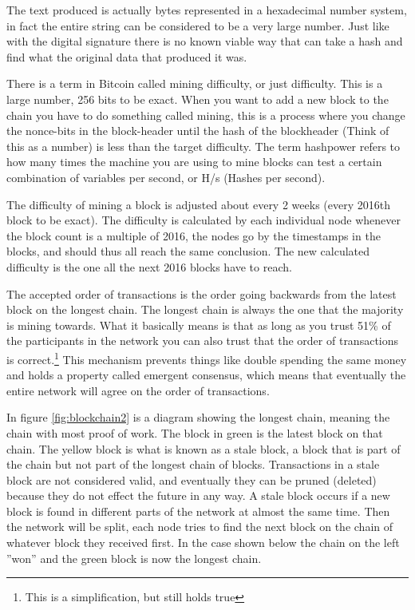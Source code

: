 The text produced is actually bytes represented in a hexadecimal number system,
in fact the entire string can be considered to be a very large number. Just like
with the digital signature there is no known viable way that can take a hash and
find what the original data that produced it was.

There is a term in Bitcoin called mining difficulty, or just difficulty. This
is a large number, 256 bits to be exact. When you want to add a new block to
the chain you have to do something called mining, this is a process where you
change the nonce-bits in the block-header until the hash of the blockheader (Think
of this as a number) is less than the target difficulty. The term hashpower refers
to how many times the machine you are using to mine blocks can test a certain
combination of variables per second, or H/s (Hashes per second).

The difficulty of mining a block is adjusted about every 2 weeks (every 2016th block to be exact). The difficulty
is calculated by each individual node whenever the block count is a multiple of 2016, the nodes go by the timestamps in the blocks, and should thus all reach the same conclusion. The new calculated difficulty is the one all the next 2016 blocks have to reach.\cite{antonopoulos_2017}

The accepted order of transactions is the order going backwards from the latest
block on the longest chain. The longest chain is always the one that the majority
is mining towards. What it basically
means is that as long as you trust 51\% of the participants in the network you
can also trust that the order of transactions is correct.\footnote{This is a simplification, but still holds true} This mechanism
prevents things like double spending the same money and holds a property called
emergent consensus, which means that eventually the entire network will agree
on the order of transactions.

In figure \ref{fig:blockchain2} is a diagram showing the longest chain, meaning
the chain with most proof of work. The block in green is the latest block on
that chain. The yellow block is what is known as a stale block, a block that is
part of the chain but not part of the longest chain of blocks. Transactions in
a stale block are not considered valid, and eventually they can be pruned
(deleted) because they do not effect the future in any way. A stale block occurs
if a new block is found in different parts of the network at almost the same
time. Then the network will be split, each node tries to find the next block on
the chain of whatever block they received first. In the case shown below the
chain on the left ''won'' and the green block is now the longest chain.

